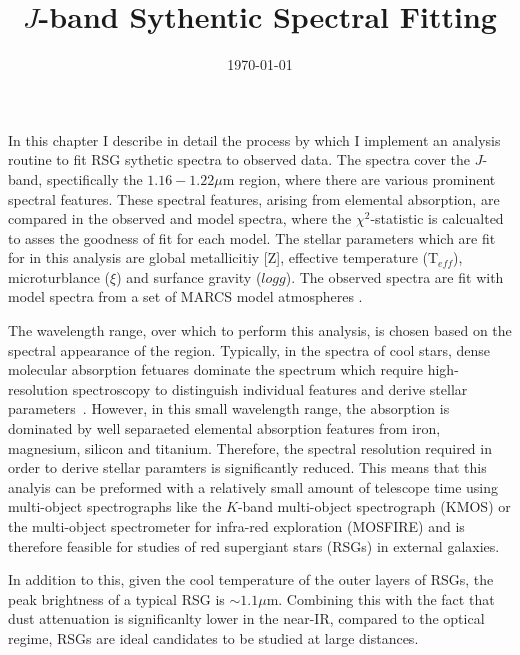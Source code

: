 \documentclass[12pt]{article}
\title{$J$-band Sythentic Spectral Fitting}
\date{\today}
\begin{document}
\maketitle

In this chapter I describe in detail the process by which I implement an analysis
routine to fit RSG sythetic spectra to observed data.
The spectra cover the $J$-band, spectifically the $1.16-1.22\mu$m region, where there are various prominent spectral features.
These spectral features, arising from elemental absorption, are compared in the observed and model spectra,
where the $\chi^{2}$-statistic is calcualted to asses the goodness of fit for each model.
The stellar parameters which are fit for in this analysis are global metallicitiy [Z], effective temperature (T$_{eff}$), microturblance ($\xi$) and surfance gravity ($log g$).
The observed spectra are fit with model spectra from a set of MARCS model atmospheres
\cite{2008A&A...486..951G}.

The wavelength range, over which to perform this analysis,
is chosen based on the spectral appearance of the region.
Typically, in the spectra of cool stars, dense molecular absorption fetuares dominate the spectrum which require high-resolution spectroscopy to distinguish individual features and derive stellar parameters~\cite{Cunha07, Davies09a, Davies09b}.
However, in this small wavelength range, the absorption is dominated by well separaeted elemental absorption features from iron, magnesium, silicon and titanium.
Therefore, the spectral resolution required in order to derive stellar paramters is significantly reduced.
This means that this analyis can be preformed with a relatively small amount of telescope time using multi-object spectrographs like the $K$-band multi-object spectrograph (KMOS)
or the multi-object spectrometer for infra-red exploration (MOSFIRE) and is therefore feasible for studies of red supergiant stars (RSGs) in external galaxies.

In addition to this, given the cool temperature of the outer layers of RSGs,
the peak brightness of a typical RSG is $\sim1.1\mu$m.
Combining this with the fact that dust attenuation is significanlty lower in the near-IR, compared to the optical regime, RSGs are ideal candidates to be studied at large distances.
\end{document}
